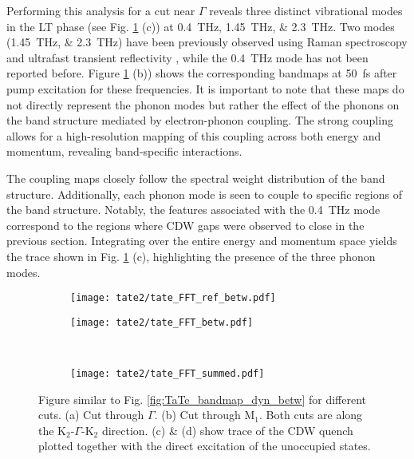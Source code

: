 Performing this analysis for a cut near $\Gamma$ reveals three distinct vibrational modes in the LT phase (see Fig. \ref{fig:TaTe_FFT_betw} (c)) at \qtylist{0.4; 1.45; 2.3}{\tera\hertz}.
Two modes (\qtylist{1.45; 2.3}{\tera\hertz}) have been previously observed using Raman spectroscopy and ultrafast transient reflectivity \cite{luo_subtle_2021, hu_optical_2022}, while the \qty{0.4}{\tera\hertz} mode has not been reported before.
Figure \ref{fig:TaTe_FFT_betw} (b)) shows the corresponding bandmaps at \qty{50}{\femto\second} after pump excitation for these frequencies.
It is important to note that these maps do not directly represent the phonon modes but rather the effect of the phonons on the band structure mediated by electron-phonon coupling.
The strong coupling allows for a high-resolution mapping of this coupling across both energy and momentum, revealing band-specific interactions.

The coupling maps closely follow the spectral weight distribution of the band structure.
Additionally, each phonon mode is seen to couple to specific regions of the band structure.
Notably, the features associated with the \qty{0.4}{\tera\hertz} mode correspond to the regions where CDW gaps were observed to close in the previous section.
Integrating over the entire energy and momentum space yields the trace shown in Fig. \ref{fig:TaTe_FFT_betw} (c), highlighting the presence of the three phonon modes.

\begin{figure}[b!]
	\centering
	\begin{subfigure}[b]{0.24\textwidth}
		\texttt{[image: tate2/tate\_FFT\_ref\_betw.pdf]}
		\caption{}
	\end{subfigure}
	\begin{subfigure}[b]{0.72\textwidth}
		\texttt{[image: tate2/tate\_FFT\_betw.pdf]}
		\caption{}
	\end{subfigure}
	\\
	\begin{subfigure}[b]{0.33\textwidth}
		\texttt{[image: tate2/tate\_FFT\_summed.pdf]}
		\caption{}
	\end{subfigure}
	\caption{Figure similar to Fig. \ref{fig:TaTe_bandmap_dyn_betw} for different cuts. (a) Cut through $\Gamma$. (b) Cut through M$_1$. Both cuts are along the K$_2$-$\Gamma$-K$_2$ direction. (c) \& (d) show trace of the CDW quench plotted together with the direct excitation of the unoccupied states.}
	\label{fig:TaTe_FFT_betw}
\end{figure}

